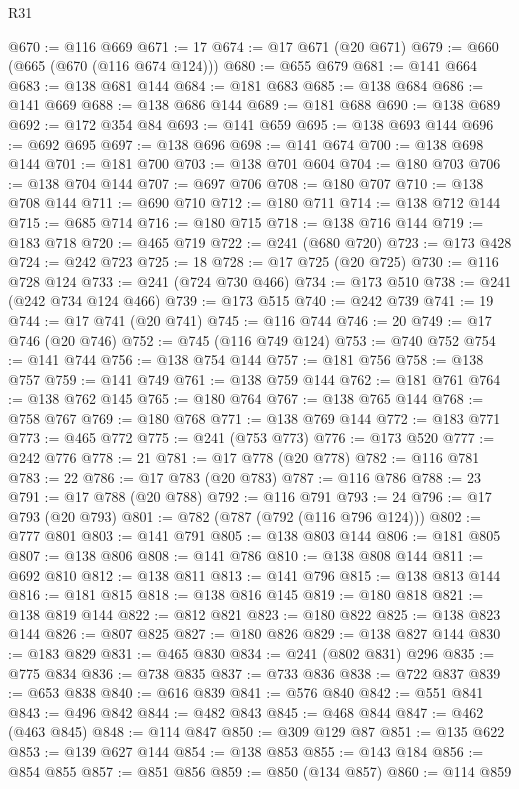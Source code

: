 \begin{lexlean}{R31}
\begin{coremodule}
@670 := @116 @669
@671 := 17
@674 := @17 @671 (@20 @671)
@679 := @660 (@665 (@670 (@116 @674 @124)))
@680 := @655 @679
@681 := @141 @664
@683 := @138 @681 @144
@684 := @181 @683
@685 := @138 @684
@686 := @141 @669
@688 := @138 @686 @144
@689 := @181 @688
@690 := @138 @689
@692 := @172 @354 @84
@693 := @141 @659
@695 := @138 @693 @144
@696 := @692 @695
@697 := @138 @696
@698 := @141 @674
@700 := @138 @698 @144
@701 := @181 @700
@703 := @138 @701 @604
@704 := @180 @703
@706 := @138 @704 @144
@707 := @697 @706
@708 := @180 @707
@710 := @138 @708 @144
@711 := @690 @710
@712 := @180 @711
@714 := @138 @712 @144
@715 := @685 @714
@716 := @180 @715
@718 := @138 @716 @144
@719 := @183 @718
@720 := @465 @719
@722 := @241 (@680 @720)
@723 := @173 @428
@724 := @242 @723
@725 := 18
@728 := @17 @725 (@20 @725)
@730 := @116 @728 @124
@733 := @241 (@724 @730 @466)
@734 := @173 @510
@738 := @241 (@242 @734 @124 @466)
@739 := @173 @515
@740 := @242 @739
@741 := 19
@744 := @17 @741 (@20 @741)
@745 := @116 @744
@746 := 20
@749 := @17 @746 (@20 @746)
@752 := @745 (@116 @749 @124)
@753 := @740 @752
@754 := @141 @744
@756 := @138 @754 @144
@757 := @181 @756
@758 := @138 @757
@759 := @141 @749
@761 := @138 @759 @144
@762 := @181 @761
@764 := @138 @762 @145
@765 := @180 @764
@767 := @138 @765 @144
@768 := @758 @767
@769 := @180 @768
@771 := @138 @769 @144
@772 := @183 @771
@773 := @465 @772
@775 := @241 (@753 @773)
@776 := @173 @520
@777 := @242 @776
@778 := 21
@781 := @17 @778 (@20 @778)
@782 := @116 @781
@783 := 22
@786 := @17 @783 (@20 @783)
@787 := @116 @786
@788 := 23
@791 := @17 @788 (@20 @788)
@792 := @116 @791
@793 := 24
@796 := @17 @793 (@20 @793)
@801 := @782 (@787 (@792 (@116 @796 @124)))
@802 := @777 @801
@803 := @141 @791
@805 := @138 @803 @144
@806 := @181 @805
@807 := @138 @806
@808 := @141 @786
@810 := @138 @808 @144
@811 := @692 @810
@812 := @138 @811
@813 := @141 @796
@815 := @138 @813 @144
@816 := @181 @815
@818 := @138 @816 @145
@819 := @180 @818
@821 := @138 @819 @144
@822 := @812 @821
@823 := @180 @822
@825 := @138 @823 @144
@826 := @807 @825
@827 := @180 @826
@829 := @138 @827 @144
@830 := @183 @829
@831 := @465 @830
@834 := @241 (@802 @831) @296
@835 := @775 @834
@836 := @738 @835
@837 := @733 @836
@838 := @722 @837
@839 := @653 @838
@840 := @616 @839
@841 := @576 @840
@842 := @551 @841
@843 := @496 @842
@844 := @482 @843
@845 := @468 @844
@847 := @462 (@463 @845)
@848 := @114 @847
@850 := @309 @129 @87
@851 := @135 @622
@853 := @139 @627 @144
@854 := @138 @853
@855 := @143 @184
@856 := @854 @855
@857 := @851 @856
@859 := @850 (@134 @857)
@860 := @114 @859

\end{coremodule}
\end{lexlean}
